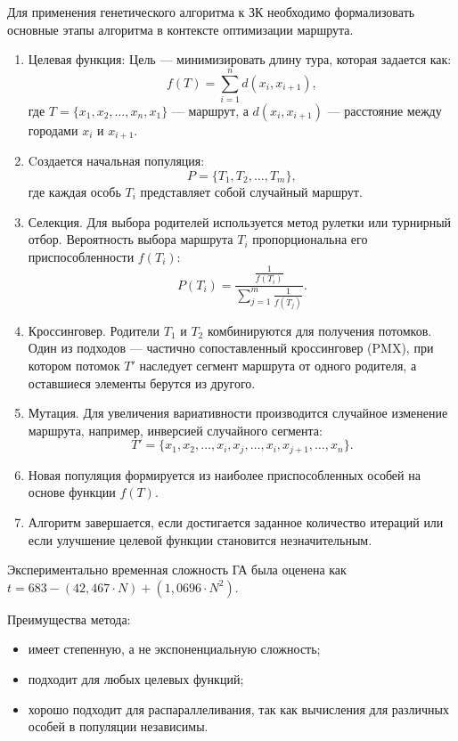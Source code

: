 Для применения генетического алгоритма к ЗК необходимо формализовать основные этапы алгоритма в контексте оптимизации маршрута.
\begin{enumerate}
    \item Целевая функция: Цель --- минимизировать длину тура, которая задается как:
    \begin{equation}
    f(T) = \sum_{i=1}^{n} d(x_i, x_{i+1}),
    \end{equation}
    где \(T = \{x_1, x_2, \dots, x_n, x_1\}\) — маршрут, а \(d(x_i, x_{i+1})\) --- расстояние между городами \(x_i\) и \(x_{i+1}\).
    \item Cоздается начальная популяция:
    \begin{equation}
    P = \{T_1, T_2, \dots, T_m\},
    \end{equation}
    где каждая особь \(T_i\) представляет собой случайный маршрут.
    \item Селекция. Для выбора родителей используется метод рулетки или турнирный отбор. Вероятность выбора маршрута \(T_i\) пропорциональна его приспособленности \(f(T_i)\):
    \begin{equation}
    P(T_i) = \frac{\frac{1}{f(T_i)}}{\sum_{j=1}^{m} \frac{1}{f(T_j)}}.
    \end{equation}
    \item Кроссинговер. Родители \(T_1\) и \(T_2\) комбинируются для получения потомков. Один из подходов — частично сопоставленный кроссинговер (PMX), при котором потомок \(T'\) наследует сегмент маршрута от одного родителя, а оставшиеся элементы берутся из другого.
    \item Мутация. Для увеличения вариативности производится случайное изменение маршрута, например, инверсией случайного сегмента:
    \begin{equation}
    T' = \{x_1, x_2, \dots, x_i, x_j, \dots, x_i, x_{j+1}, \dots, x_n\}.
    \end{equation}
    \item Новая популяция формируется из наиболее приспособленных особей на основе функции \(f(T)\).
    \item Алгоритм завершается, если достигается заданное количество итераций или если улучшение целевой функции становится незначительным.
\end{enumerate}
Экспериментально временная сложность ГА была оценена как $t = 683 - (42,467 · N) + (1,0696 · N^2)$.

Преимущества метода:
\begin{itemize}[label=---]
    \item имеет степенную, а не экспоненциальную сложность;
    \item подходит для любых целевых функций;
    \item хорошо подходит для распараллеливания, так как вычисления для различных особей в популяции независимы.
\end{itemize}

